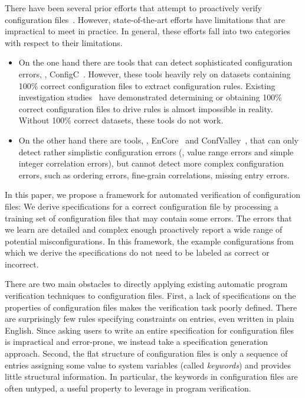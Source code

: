 There have been several prior efforts that attempt to proactively verify 
configuration files~\cite{santolucitoCAV, xu16early,
zhang14encore, huang15confvalley}.
However, state-of-the-art efforts have limitations that are impractical to meet in practice.
In general, these efforts fall into two categories with respect to their limitations.
\begin{itemize}
\item On the one hand there are tools that can detect sophisticated 
configuration errors, \eg, ConfigC~\cite{santolucitoCAV}. 
However, these tools heavily rely on datasets containing 100\% 
correct configuration files to extract configuration rules.
Existing investigation studies~\cite{wang04automatic, yin11anempirical}
have demonstrated determining or obtaining 100\% correct configuration
files to drive rules is almost impossible in reality. 
Without 100\% correct datasets, these tools do not work.
\item On the other hand there are tools, 
\eg, EnCore~\cite{zhang14encore} and
ConfValley~\cite{huang15confvalley}, that can only 
detect rather simplistic configuration errors (\eg, value range errors 
and simple integer correlation errors), but cannot detect
more complex configuration errors, such as ordering errors, fine-grain correlations, missing entry errors.
\end{itemize}

In this paper, we propose a framework for automated verification of configuration files: 
We derive specifications for a correct configuration file by processing a training set of configuration files that may contain some errors.
The errors that we learn are detailed and complex enough proactively report a wide range of potential misconfigurations.
In this framework, the example configurations from which we derive the specifications do not need to be labeled as correct or incorrect.

There are two main obstacles to directly applying existing automatic program
verification techniques to configuration files.
First, a lack of specifications on the properties of configuration files makes the verification task poorly defined.
There are surprisingly few rules specifying constraints on entries, even written in plain English.
Since asking users to write an entire specification for configuration files is impractical and error-prone, we instead take a specification generation approach.
Second, the flat structure of configuration files is only a sequence of entries assigning some value to system
variables (called {\emph {keywords}}) and provides little structural information.
In particular, the keywords in configuration files are often untyped, a useful property to leverage in program verification.

